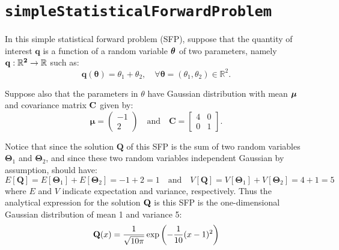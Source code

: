 \section{\texttt{simpleStatisticalForwardProblem}}\label{sec:example_sfp}

In this simple statistical forward problem (SFP), suppose that the quantity of interest $\mathbf{q}$ is a function of a random variable $\mbox{\boldmath$ \theta $}$ of two parameters, namely $\bf{q}:\mathbb{R}^2\rightarrow\mathbb{R}$ such as:
\begin{equation}\label{eq-example-q}
\mathbf{q}(\boldsymbol{\theta}) = \theta_1+\theta_2,\quad\forall\boldsymbol{\theta}=(\theta_1,\theta_2)\in\mathbb{R}^2.
\end{equation}

Suppose also that the parameters in $\theta$ have Gaussian distribution with mean $\mbox{\boldmath$ \mu $}$ and covariance matrix $\bf{C}$ given by:
\begin{equation}\label{eq-example-mu-sfp}
\boldsymbol{\mu} =
\left(\begin{array}{c}
-1 \\
2
\end{array}\right)
\quad
\text{and}
\quad
\mathbf{C} =
\left[\begin{array}{cc}
4 & 0 \\
0 & 1
\end{array}\right].
\end{equation}


Notice that since the solution $\mathbf{Q}$ of this SFP is the sum of two random variables $\boldsymbol{\Theta}_1$ and $\boldsymbol{\Theta}_2$, and since these two random variables independent Gaussian by assumption, should have:
\begin{equation}\label{eq-example-E-V}
E[\mathbf{Q}] = E[\boldsymbol{\Theta}_1] + E[\boldsymbol{\Theta}_2] = -1 + 2 = 1 \quad \text{and} \quad
%
V[\mathbf{Q}] = V[\boldsymbol{\Theta}_1] + V[\boldsymbol{\Theta}_2] = 4 + 1 = 5
\end{equation}
where $E$ and $V$ indicate expectation and variance, respectively. Thus the analytical expression for the solution $\bf{Q}$ is this SFP is the one-dimensional Gaussian distribution of mean 1 and variance 5:
\begin{equation}\label{eq-example-sfp-analytical}
{\bf Q}(x)=   \frac{1}{ \sqrt{10\pi}} \exp\left(-\frac{1}{10}(x-1)^2 \right)
\end{equation}


